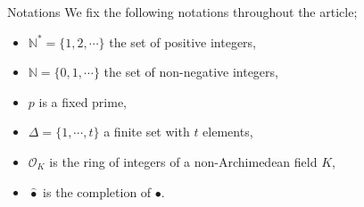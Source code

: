 \documentclass[12pts,a4paper]{amsart}
\begin{document}
\begin{subsection}{Notations}
    We fix the following notations throughout the article;
    \begin{itemize}
        \item $\mathbb{N}^*=\{1,2,\cdots\}$ the set of positive integers,
        \item $\mathbb{N}=\{0,1,\cdots\}$ the set of non-negative integers,
        \item $p$ is a fixed prime,
        \item $\Delta=\{1,\cdots,t\}$ a finite set with $t$ elements,
        \item $\mathcal{O}_K$ is the ring of integers of a non-Archimedean field $K$,
        \item $\hat{\bullet}$ is the completion of $\bullet$.
    \end{itemize}
\end{subsection}
\end{document}
